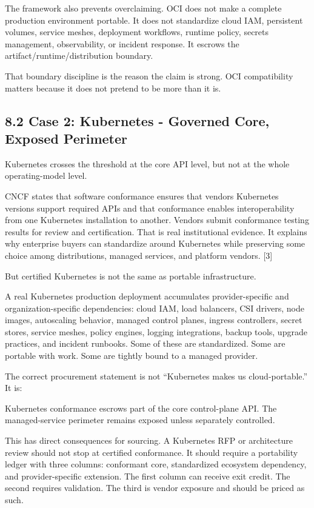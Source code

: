 \documentclass[11pt]{article}
\begin{document}
The framework also prevents overclaiming. OCI does not make a complete production environment portable. It does not standardize cloud IAM, persistent volumes, service meshes, deployment workflows, runtime policy, secrets management, observability, or incident response. It escrows the artifact/runtime/distribution boundary.

That boundary discipline is the reason the claim is strong. OCI compatibility matters because it does not pretend to be more than it is.

\subsection{8.2 Case 2: Kubernetes - Governed Core, Exposed Perimeter}\label{case-2-kubernetes-governed-core-exposed-perimeter}

Kubernetes crosses the threshold at the core API level, but not at the whole operating-model level.

CNCF states that software conformance ensures that vendors\textquotesingle{} Kubernetes versions support required APIs and that conformance enables interoperability from one Kubernetes installation to another. Vendors submit conformance testing results for review and certification. That is real institutional evidence. It explains why enterprise buyers can standardize around Kubernetes while preserving some choice among distributions, managed services, and platform vendors. {[}3{]}

But certified Kubernetes is not the same as portable infrastructure.

A real Kubernetes production deployment accumulates provider-specific and organization-specific dependencies: cloud IAM, load balancers, CSI drivers, node images, autoscaling behavior, managed control planes, ingress controllers, secret stores, service meshes, policy engines, logging integrations, backup tools, upgrade practices, and incident runbooks. Some of these are standardized. Some are portable with work. Some are tightly bound to a managed provider.

The correct procurement statement is not ``Kubernetes makes us cloud-portable.'' It is:

Kubernetes conformance escrows part of the core control-plane API. The managed-service perimeter remains exposed unless separately controlled.

This has direct consequences for sourcing. A Kubernetes RFP or architecture review should not stop at certified conformance. It should require a portability ledger with three columns: conformant core, standardized ecosystem dependency, and provider-specific extension. The first column can receive exit credit. The second requires validation. The third is vendor exposure and should be priced as such.
\end{document}
